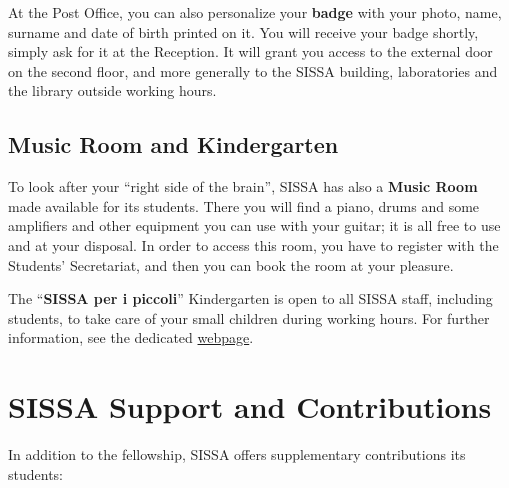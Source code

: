 \documentclass{sissavademecum}
\begin{document}
At the Post Office, you can also personalize your \hypertarget{Badge}{}\textbf{badge} with your photo, name, surname and date of birth printed on it. You will receive your badge shortly, simply ask for it at the Reception. It will grant you access to the external door on the second floor, and more generally to the SISSA building, laboratories and the library outside working hours.


\section{Music Room and Kindergarten}

To look after your ``right side of the brain'', SISSA has also a \textbf{Music Room} made available for its students. There you will find a piano, drums and some amplifiers and other equipment you can use with your guitar; it is all free to use and at your disposal. In order to access this room, you have to register with the Students' Secretariat, and then you can book the room at your pleasure.

The ``\textbf{SISSA per i piccoli}{}'' Kindergarten is open to all SISSA staff, including students, to take care of your small children during working hours. For further information, see the dedicated \href{https://www.sissa.it/kindergarten}{webpage}.


\chapter{SISSA Support and Contributions}


In addition to the fellowship, SISSA offers supplementary contributions its students:
\end{document}
